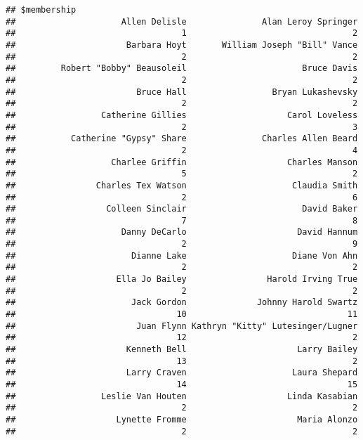 \documentclass[
]{article}
\begin{document}
\begin{verbatim}
## $membership
##                     Allen Delisle               Alan Leroy Springer 
##                                 1                                 2 
##                      Barbara Hoyt       William Joseph "Bill" Vance 
##                                 2                                 2 
##         Robert "Bobby" Beausoleil                       Bruce Davis 
##                                 2                                 2 
##                        Bruce Hall                 Bryan Lukashevsky 
##                                 2                                 2 
##                 Catherine Gillies                    Carol Loveless 
##                                 2                                 3 
##           Catherine "Gypsy" Share               Charles Allen Beard 
##                                 2                                 4 
##                   Charlee Griffin                    Charles Manson 
##                                 5                                 2 
##                Charles Tex Watson                     Claudia Smith 
##                                 2                                 6 
##                  Colleen Sinclair                       David Baker 
##                                 7                                 8 
##                     Danny DeCarlo                      David Hannum 
##                                 2                                 9 
##                       Dianne Lake                     Diane Von Ahn 
##                                 2                                 2 
##                    Ella Jo Bailey                Harold Irving True 
##                                 2                                 2 
##                       Jack Gordon              Johnny Harold Swartz 
##                                10                                11 
##                        Juan Flynn Kathryn "Kitty" Lutesinger/Lugner 
##                                12                                 2 
##                      Kenneth Bell                      Larry Bailey 
##                                13                                 2 
##                      Larry Craven                     Laura Shepard 
##                                14                                15 
##                 Leslie Van Houten                    Linda Kasabian 
##                                 2                                 2 
##                    Lynette Fromme                      Maria Alonzo 
##                                 2                                 2 

\end{verbatim}
\end{document}
